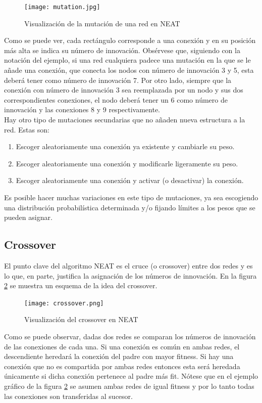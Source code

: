 \documentclass{article}
\begin{document}
\begin{figure}[htbp]
\centering
\texttt{[image: mutation.jpg]}
\caption{Visualización de la mutación de una red en NEAT}
\label{fig:mutacion}
\end{figure}

Como se puede ver, cada rectángulo corresponde a una conexión y en su posición más alta se indica su número de innovación. Obsérvese que, siguiendo con la notación del ejemplo, si una red cualquiera padece una mutación en la que se le añade una conexión, que conecta los nodos con número de innovación 3 y 5, esta deberá tener como número de innovación 7. Por otro lado, siempre que la conexión con número de innovación 3 sea reemplazada por un nodo y sus dos correspondientes conexiones, el nodo deberá tener un 6 como número de innovación y las conexiones 8 y 9 respectivamente.\\

Hay otro tipo de mutaciones secundarias que no añaden nueva estructura a la red. Estas son:
\begin{enumerate}
\item Escoger aleatoriamente una conexión ya existente y cambiarle su peso.
\item Escoger aleatoriamente una conexión y modificarle ligeramente su peso.
\item Escoger aleatoriamente una conexión y activar (o desactivar) la conexión.
\end{enumerate}
Es posible hacer muchas variaciones en este tipo de mutaciones, ya sea escogiendo una distribución probabilística determinada y/o fijando límites a los pesos que se pueden asignar.

\subsection{Crossover}
El punto clave del algoritmo NEAT es el cruce (o crossover) entre dos redes y es lo que, en parte, justifica la asignación de los números de innovación. En la figura \ref{fig:crossover} se muestra un esquema de la idea del crossover.\\

\begin{figure}[htbp]
\centering
\texttt{[image: crossover.png]}
\caption{Visualización del crossover en NEAT}
\label{fig:crossover}
\end{figure}

Como se puede observar, dadas dos redes se comparan los números de innovación de las conexiones de cada una. Si una conexión es común en ambas redes, el descendiente heredará la conexión del padre con mayor fitness. Si hay una conexión que no es compartida por ambas redes entonces esta será heredada únicamente si dicha conexión pertenece al padre más fit. Nótese que en el ejemplo gráfico de la figura \ref{fig:crossover} se asumen ambas redes de igual fitness y por lo tanto todas las conexiones son transferidas al sucesor.\\
\end{document}
